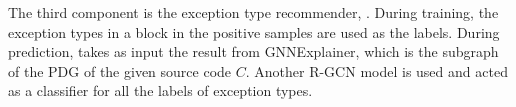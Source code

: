 The third component is the exception type recommender, {\xtype}.
During training, the exception types in a  block in
the positive samples are used as the labels. During prediction,
{\xtype} takes as input the result from GNNExplainer, which is the
subgraph of the PDG of the given source code $C$. Another R-GCN model
is used and acted as a classifier for all the labels of exception
types.
